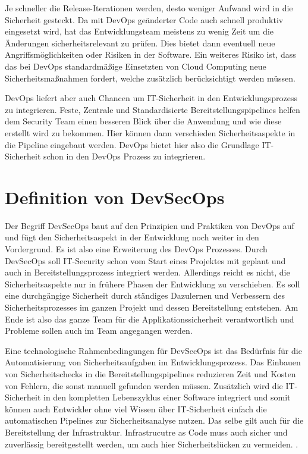 Je schneller die Release-Iterationen werden, desto weniger Aufwand wird in die Sicherheit gesteckt. Da mit DevOps geänderter Code auch schnell produktiv eingesetzt wird, hat das Entwicklungsteam meistens zu wenig Zeit um die Änderungen sicherheitsrelevant zu prüfen. Dies bietet dann eventuell neue Angriffsmöglichkeiten oder Risiken in der Software.
Ein weiteres Risiko ist, dass das bei DevOps standardmäßige Einsetzten von Cloud Computing neue Sicherheitsmaßnahmen fordert, welche zusätzlich berücksichtigt werden müssen.


DevOps liefert aber auch Chancen um IT-Sicherheit in den Entwicklungsprozess zu integrieren.
Feste, Zentrale und Standardisierte Bereitstellungspipelines helfen dem Security Team einen besseren Blick über die Anwendung und wie diese erstellt wird zu bekommen. Hier können dann verschieden Sicherheitsaspekte in die Pipeline eingebaut werden. DevOps bietet hier also die Grundlage IT-Sicherheit schon in den DevOps Prozess zu integrieren. \cite{grey}

\section{Definition von DevSecOps}
Der Begriff DevSecOps baut auf den Prinzipien und Praktiken von DevOps auf und fügt den Sicherheitsaspekt in der Entwicklung noch weiter in den Vordergrund. Es ist also eine Erweiterung des DevOps Prozesses. Durch DevSecOps soll IT-Security schon vom Start eines Projektes mit geplant und auch in Bereitstellungsprozess integriert werden. Allerdings reicht es nicht, die Sicherheitsaspekte nur in frühere Phasen der Entwicklung zu verschieben. Es soll eine durchgängige Sicherheit durch ständiges Dazulernen und Verbessern des Sicherheitsprozesses im ganzen Projekt und dessen Bereitstellung entstehen. \cite{grey}
Am Ende ist also das ganze Team für die Applikationssicherheit verantwortlich und Probleme sollen auch im Team angegangen werden. \cite{devsecops-techniques}

Eine technologische Rahmenbedingungen für DevSecOps ist das Bedürfnis für die Automatisierung von Sicherheitsaufgaben im Entwicklungsprozess. Das Einbauen von Sicherheitschecks in die Bereitstellungspipelines reduzieren Zeit und Kosten von Fehlern, die sonst manuell gefunden werden müssen. Zusätzlich wird die IT-Sicherheit in den kompletten Lebenszyklus einer Software integriert und somit können auch Entwickler ohne viel Wissen über IT-Sicherheit einfach die automatischen Pipelines zur Sicherheitsanalyse nutzen. Das selbe gilt auch für die Bereitstellung der Infrastruktur. Infrastrucutre as Code muss auch sicher und zuverlässig bereitgestellt werden, um auch hier Sicherheitslücken zu vermeiden. \cite{grey}.

